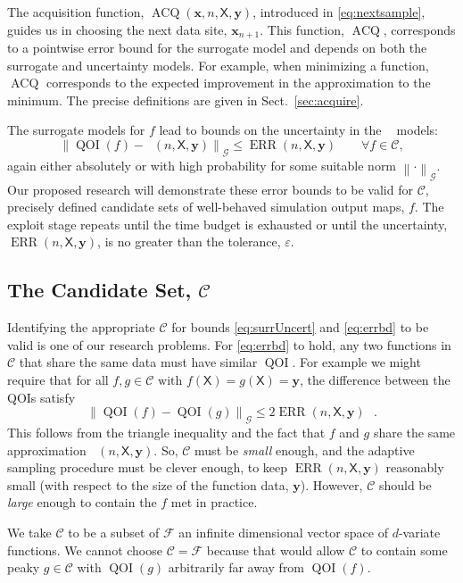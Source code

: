 \documentclass[11pt]{NSFamsart}
\DeclareMathOperator{\QOI}{QOI} %
\DeclareMathOperator{\APP}{\widehat{\QOI}}
\DeclareMathOperator{\ERR}{ERR}
\DeclareMathOperator{\VAL}{ACQ}
\newcommand{\mX}{\mathsf{X}}
\newcommand{\bx}{{\boldsymbol{x}}}
\newcommand{\by}{{\boldsymbol{y}}}
\newcommand{\calc}{{\mathcal{C}}}
\newcommand{\calf}{{\mathcal{F}}}
\newcommand{\calg}{{\mathcal{G}}}
\newcommand{\norm}[2][{}]{\ensuremath{\left \lVert #2 \right \rVert}_{#1}}
\newcommand{\bignorm}[2][{}]{\ensuremath{\bigl \lVert #2 \bigr \rVert}_{#1}}
\begin{document}
The acquisition function, $\VAL(\bx,n,\mX, \by)$, introduced in \eqref{eq:nextsample}, guides us in choosing the next data site, $\bx_{n+1}$.  
This function, $\VAL$, corresponds to a pointwise error bound for the surrogate model and depends on both the surrogate and  uncertainty models.  For example, when minimizing a function, $\VAL$ corresponds to the expected improvement in the approximation to the minimum. The precise definitions are given in Sect.\ \ref{sec:acquire}.

The surrogate models for $f$ lead to bounds on the uncertainty in the $\APP$ models:
\begin{equation} \label{eq:errbd}
\bignorm[\calg]{\QOI(f) - \APP(n,\mX,\by)} \le \ERR(n,\mX,\by) \qquad \forall f \in \calc,
\end{equation}
again either absolutely or with high probability for some suitable norm $\norm[\calg]{\cdot}$. 
Our proposed research will demonstrate these error bounds to be valid for $\calc$, precisely defined candidate sets of well-behaved simulation output maps, $f$. 
The exploit stage repeats until the time budget is exhausted or until  the uncertainty, $\ERR(n,\mX,\by)$, is no greater than the tolerance, $\varepsilon$.

\subsection{The Candidate Set, $\calc$} 
Identifying the appropriate $\calc$ for bounds  \eqref{eq:surrUncert} and \eqref{eq:errbd} to be valid is one of our research problems.
For \eqref{eq:errbd}  to hold, any two functions in $\calc$ that share the same data must have similar $\QOI$.  For example we might require that for all $f, g \in \calc \text{ with } f(\mX) = g(\mX) = \by$, the difference between the QOIs satisfy
\begin{equation} \label{eq:Csmall}
	\bignorm[\calg]{\QOI(f) - \QOI(g)} \le 2 \ERR(n,\mX,\by) ~~~ .
\end{equation}
This follows from the triangle inequality and the fact that $f$ and $g$ share the same approximation $\APP(n,\mX,\by)$. So, $\calc$ must be \emph{small} enough, and the adaptive sampling procedure must be clever enough, to keep $\ERR(n,\mX,\by)$ reasonably small (with respect to the size of the function data, $\by$).  However, $\calc$ should be \emph{large} enough to contain the $f$ met in practice.

We take $\calc$ to be a subset of $\calf$ an infinite dimensional vector space of $d$-variate functions. We cannot choose $\calc = \calf$ because that would allow $\calc$ to contain some peaky $g \in \calc$ with $\QOI(g)$ arbitrarily far away from $\QOI(f)$. 
\end{document}
